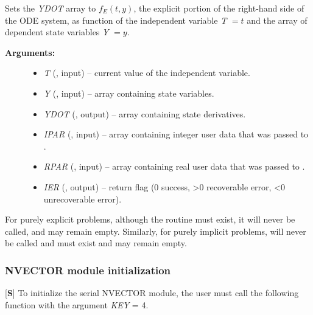 \documentclass[letterpaper,10pt,english]{sphinxmanual}
\begin{document}
\begin{fulllineitems}
\label{f_interface/Usage:f/_/FARKEFUN}
Sets the \emph{YDOT} array to $f_E(t,y)$, the explicit portion of
the right-hand side of the ODE system, as function of the
independent variable \emph{T} $=t$ and the array of dependent state
variables \emph{Y} $=y$.
\begin{description}
\item[{\textbf{Arguments:}}] \leavevmode\begin{itemize}
\item {} 
\emph{T} (, input) -- current value of the independent variable.

\item {} 
\emph{Y} (, input) -- array containing state variables.

\item {} 
\emph{YDOT} (, output) -- array containing state derivatives.

\item {} 
\emph{IPAR} (, input) -- array containing integer user
data that was passed to {\hyperref[f_interface/Usage:f/_/FARKMALLOC]{}}.

\item {} 
\emph{RPAR} (, input) -- array containing real user
data that was passed to {\hyperref[f_interface/Usage:f/_/FARKMALLOC]{}}.

\item {} 
\emph{IER} (, output) -- return flag (0 success, \textgreater{}0
recoverable error, \textless{}0 unrecoverable error).

\end{itemize}

\end{description}

\end{fulllineitems}


For purely explicit problems, although the routine
{\hyperref[f_interface/Usage:f/_/FARKIFUN]{}} must exist, it will never be called, and may
remain empty.  Similarly, for purely implicit problems,
{\hyperref[f_interface/Usage:f/_/FARKEFUN]{}} will never be called and must exist and may
remain empty.


\subsubsection{NVECTOR module initialization}
\label{f_interface/Usage:nvector-module-initialization}\label{f_interface/Usage:finterface-nvector}
{[}\textbf{S}{]} To initialize the serial NVECTOR module, the user must
call the following function with the argument \emph{KEY} = 4.
\end{document}
